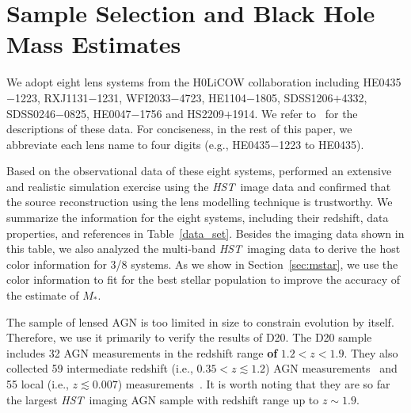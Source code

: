 \documentclass[fleqn,usenatbib]{mnras}
\newcommand{\hst}{{\it HST}}
\newcommand{\mstar}{{$M_*$}}
\begin{document}
\section{Sample Selection and Black Hole Mass Estimates}\label{sec:sample_select}
We adopt eight lens systems from the H0LiCOW collaboration including HE0435$-$1223, RXJ1131$-$1231, WFI2033$-$4723, HE1104$-$1805, SDSS1206$+$4332, SDSS0246$-$0825, HE0047$-$1756 and HS2209$+$1914. We refer to~\citet{Suyu2017, Ding2017a} for the descriptions of these data. For conciseness, in the rest of this paper, we abbreviate each lens name to four digits (e.g., HE0435$-$1223 to HE0435). 

Based on the observational data of these eight systems, \citet{Ding2017a} performed an extensive and realistic simulation exercise using the \hst\ image data and confirmed that the source reconstruction using the lens modelling technique is trustworthy. We summarize the information for the eight systems, including their redshift, data properties, and references in Table~\ref{data_set}.
Besides the imaging data shown in this table, we also analyzed the multi-band \hst\ imaging data to derive the host color information for 3/8 systems. As we show in Section~\ref{sec:mstar}, we use the color information to fit for the best stellar population to improve the accuracy of the estimate of \mstar. 

The sample of lensed AGN is too limited in size to constrain evolution by itself. Therefore, we use it primarily to verify the results of D20.  The D20 sample includes 32 AGN measurements in the redshift range {\bf of} $1.2<z<1.9$. They also collected 59 intermediate redshift (i.e., $0.35<z\lesssim1.2$) AGN measurements~\citep{Bennert11, SS13, Cisternas2011} and 55 local (i.e., $z\lesssim0.007$) measurements~\citep{Bennert++2011, H+R04}. It is worth noting that they are so far the largest \hst\ imaging AGN sample with redshift range up to $z\sim1.9$. 
 
\end{document}

